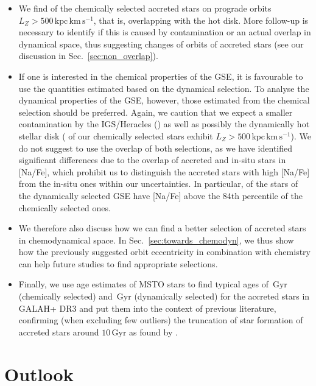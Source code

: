 \documentclass[fleqn,usenatbib]{mnras}
\newcommand{\Gyr}{\,\mathrm{Gyr}}	%
\newcommand{\kpckms}{\,\mathrm{kpc\,km\,s^{-1}}}	%
\begin{document}
\begin{itemize}
\item We find  of the chemically selected accreted stars on prograde orbits $L_Z > 500 \kpckms$, that is, overlapping with the hot disk. More follow-up is necessary to identify if this is caused by contamination or an actual overlap in dynamical space, thus suggesting changes of orbits of accreted stars (see our discussion in Sec.~\ref{sec:non_overlap}).
\item If one is interested in the chemical properties of the GSE, it is favourable to use the quantities estimated based on the dynamical selection. To analyse the dynamical properties of the GSE, however, those estimated from the chemical selection should be preferred. Again, we caution that we expect a smaller contamination by the IGS/Heracles () as well as possibly the dynamically hot stellar disk ( of our chemically selected stars exhibit $L_Z > 500\kpckms$). We do not suggest to use the overlap of both selections, as we have identified significant differences due to the overlap of accreted and in-situ stars in [Na/Fe], which prohibit us to distinguish the accreted stars with high [Na/Fe] from the in-situ ones within our uncertainties. In particular,  of the stars of the dynamically selected GSE have [Na/Fe] above the 84th percentile of the chemically selected ones.
\item We therefore also discuss how we can find a better selection of accreted stars in chemodynamical space. In Sec.~\ref{sec:towards_chemodyn}, we thus show how the previously suggested orbit eccentricity \citep[see e.g.][]{Mackereth2019, Naidu2020} in combination with chemistry can help future studies to find appropriate selections.
\item Finally, we use age estimates of MSTO stars to find typical ages of $\Gyr$ (chemically selected) and $\Gyr$ (dynamically selected) for the accreted stars in GALAH+ DR3 and put them into the context of previous literature, confirming (when excluding few outliers) the truncation of star formation of accreted stars around $10\Gyr$ as found by \citet{Bonaca2020}.
\end{itemize}

\section{Outlook} \label{sec:Outlook}
\end{document}
